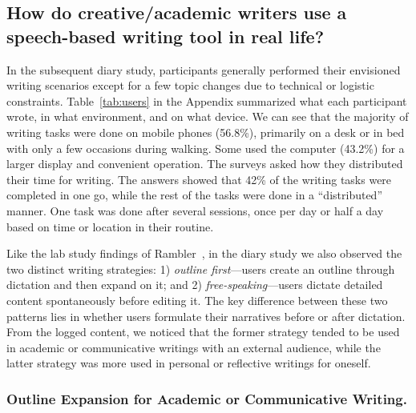 \subsection{How do creative/academic writers use a speech-based writing tool in real life? }
In the subsequent diary study, participants generally performed their envisioned writing scenarios except for a few topic changes due to technical or logistic constraints. Table~\ref{tab:users} in the Appendix summarized what each participant wrote, in what environment, and on what device. We can see that the majority of writing tasks were done on mobile phones (56.8\%), primarily on a desk or in bed with only a few occasions during walking. Some used the computer (43.2\%) for a larger display and convenient operation. The surveys asked how they distributed their time for writing. The answers showed that 42\% of the writing tasks were completed in one go, while the rest of the tasks were done in a ``distributed'' manner. One task was done after several sessions, once per day or half a day based on time or location in their routine. 

Like the lab study findings of Rambler~\cite{lin2024rambler}, in the diary study we also observed the two distinct writing strategies: 1) \textit{outline first}---users create an outline through dictation and then expand on it; and 2) \textit{free-speaking}---users dictate detailed content spontaneously before editing it. The key difference between these two patterns lies in whether users formulate their narratives before or after dictation. From the logged content, we noticed that the former strategy tended to be used in academic or communicative writings with an external audience, while the latter strategy was more used in personal or reflective writings for oneself. 

\subsubsection{Outline Expansion for Academic or Communicative Writing.}

